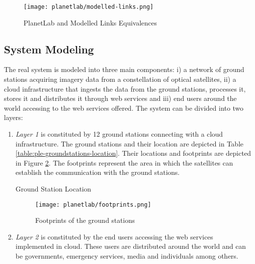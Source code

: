 \begin{figure}[!h]
\begin{center}
\texttt{[image: planetlab/modelled-links.png]}
\caption{PlanetLab and Modelled Links Equivalences}
\label{fig:ple-modelled-links}
\end{center}
\end{figure}


\subsection{System Modeling}

The real system is modeled into three main components: i) a network of ground stations acquiring imagery data from a constellation of optical satellites, ii) a cloud infrastructure that ingests the data from the ground stations, processes it, stores it and distributes it through web services and iii) end users around the world accessing to the web services offered. The system can be divided into two layers: 

\begin{enumerate}

\item \emph{Layer 1} is constituted by 12 ground stations connecting with a cloud
  infrastructure. The ground stations and their location are depicted in Table \ref{table:ple-groundstations-location}. Their locations and footprints are depicted in Figure \ref{fig:ple-footprints}. The footprints represent the area in which the satellites can establish the communication with the ground stations.

\begin{table}[hp]
  \centering
  {\small
  
  }
  \caption{Ground Station Location}
  \label{table:ple-groundstations-location}
\end{table}

\begin{figure}[!h]
\begin{center}
\texttt{[image: planetlab/footprints.png]}

\caption{Footprints of the ground stations}
\label{fig:ple-footprints}
\end{center}
\end{figure}


\item \emph{Layer 2} is constituted by the end users accessing the web services
  implemented in cloud. These users are distributed around the world and can be
  governments, emergency services, media and individuals among others.
\end{enumerate}

